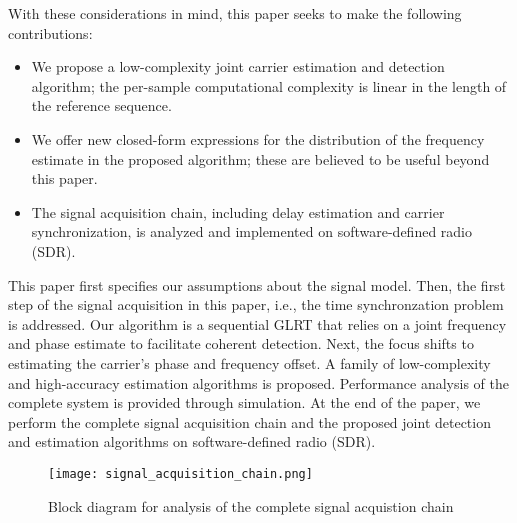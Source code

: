 With these considerations in mind, this paper seeks to make the following contributions:
\begin{itemize}
\item We propose a low-complexity joint carrier estimation and detection algorithm; the per-sample computational complexity is linear
in the length of the reference sequence.
\item We offer new closed-form expressions for the distribution of the frequency estimate in the proposed algorithm; these are believed
to be useful beyond this paper.
\item The signal acquisition chain, including delay estimation and carrier synchronization, is analyzed and implemented on software-defined radio (SDR).
\end{itemize}

This paper first specifies our assumptions about the signal
model. Then, the first step of the signal acquisition in this paper, i.e., the time synchronzation
problem is addressed. Our algorithm is a sequential GLRT that relies on a joint frequency and phase
estimate to facilitate coherent detection. Next, the focus shifts to estimating the carrier's phase 
and frequency offset. A family of low-complexity and high-accuracy estimation algorithms is proposed.
Performance analysis of the complete system is provided through simulation. At the end of the paper,
we perform the complete signal acquisition chain and the proposed joint detection and estimation algorithms
on software-defined radio (SDR).

\begin{figure*}[t]
    \centerline{\texttt{[image: signal\_acquisition\_chain.png]}}
    \caption{Block diagram for analysis of the complete signal acquistion chain}
    \label{fig:sig_acquis_chain}
    \end{figure*}



